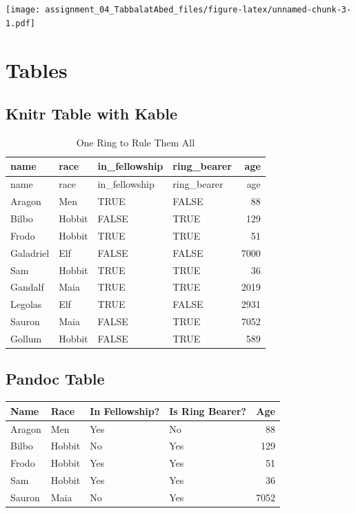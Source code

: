 \documentclass[
]{article}
\begin{document}
\texttt{[image: assignment\_04\_TabbalatAbed\_files/figure-latex/unnamed-chunk-3-1.pdf]}

\hypertarget{tables}{%
\section{Tables}\label{tables}}

\hypertarget{knitr-table-with-kable}{%
\subsection{Knitr Table with Kable}\label{knitr-table-with-kable}}

\begin{longtable}[]{@{}llllr@{}}
\caption{One Ring to Rule Them All}\tabularnewline
\toprule
name & race & in\_fellowship & ring\_bearer & age \\
\midrule
\endfirsthead
\toprule
name & race & in\_fellowship & ring\_bearer & age \\
\midrule
\endhead
Aragon & Men & TRUE & FALSE & 88 \\
Bilbo & Hobbit & FALSE & TRUE & 129 \\
Frodo & Hobbit & TRUE & TRUE & 51 \\
Galadriel & Elf & FALSE & FALSE & 7000 \\
Sam & Hobbit & TRUE & TRUE & 36 \\
Gandalf & Maia & TRUE & TRUE & 2019 \\
Legolas & Elf & TRUE & FALSE & 2931 \\
Sauron & Maia & FALSE & TRUE & 7052 \\
Gollum & Hobbit & FALSE & TRUE & 589 \\
\bottomrule
\end{longtable}

\hypertarget{pandoc-table}{%
\subsection{Pandoc Table}\label{pandoc-table}}

\begin{longtable}[]{@{}llllr@{}}
\toprule
Name & Race & In Fellowship? & Is Ring Bearer? & Age \\
\midrule
\endhead
Aragon & Men & Yes & No & 88 \\
Bilbo & Hobbit & No & Yes & 129 \\
Frodo & Hobbit & Yes & Yes & 51 \\
Sam & Hobbit & Yes & Yes & 36 \\
Sauron & Maia & No & Yes & 7052 \\
\bottomrule
\end{longtable}
\end{document}
